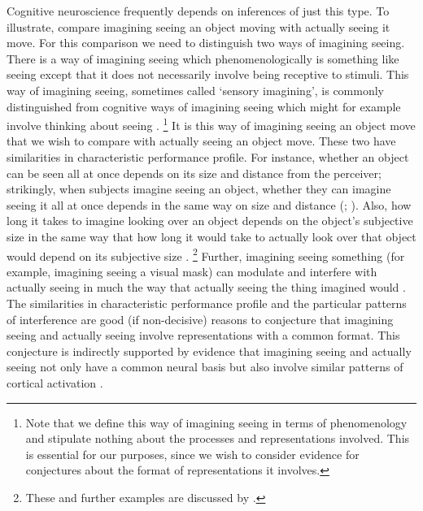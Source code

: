 \documentclass[12pt,\papersize]{extarticle}
\begin{document}
Cognitive neuroscience frequently depends on inferences of just this type.
To illustrate, compare imagining seeing an object moving with actually seeing it move. For this comparison we need to distinguish two ways of imagining seeing. There is a way of imagining seeing which phenomenologically is something like seeing except that it does not necessarily involve being receptive to stimuli. This way of imagining seeing, sometimes called `sensory imagining', is commonly distinguished from cognitive ways of imagining seeing which might for example involve thinking about seeing \citep[§2.1]{Gendler:2011_imagination}.%
\footnote{Note that we define this way of imagining seeing in terms of phenomenology and stipulate nothing about the processes and representations involved.  This is essential for our purposes, since we wish to consider evidence for conjectures about the format of representations it involves.}
It is this way of imagining seeing an object move that we wish to compare with actually seeing an object move.  These two have similarities in characteristic performance profile.  For instance, whether an object can be seen all at once depends on its size and distance from the perceiver; strikingly, when subjects imagine seeing an object, whether they can imagine seeing it all at once depends in the same way on size and distance (\citealp{kosslyn:1978_measuring}; \citealp[p.\ 99ff]{kosslyn:1994_image}).  Also, how long it takes to imagine looking over an object depends on the object's subjective size in the same way that how long it would take to actually look over that object would depend on its subjective size \citep{kosslyn:1978_visual}.%
\footnote{These and further examples are discussed by \citet[p.\ 165]{currie:1997_mental}.
} 
Further, imagining seeing something (for example, imagining seeing a visual mask) can modulate and interfere with actually seeing in much the way that actually seeing the thing imagined would \citep{pearson:2008_functional, ishai:1995_common}. The similarities in characteristic performance profile and the particular patterns of interference are good (if non-decisive) reasons to conjecture that imagining seeing and actually seeing involve representations with a common format. This conjecture is indirectly supported by evidence that imagining seeing and actually seeing not only have a common neural basis but also involve similar patterns of cortical activation \citep[e.g.][]{page:2011_erp}.
\end{document}
